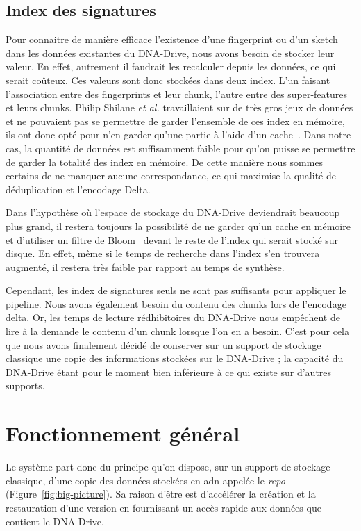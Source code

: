 \documentclass[a4paper]{report}
\makeatletter
\newcommand{\etal}{\emph{et al.}\@\xspace}
\makeatother
\begin{document}
\subsection{Index des signatures}
Pour connaitre de manière efficace l'existence d'une fingerprint
ou d'un sketch dans les données existantes du DNA-Drive, nous avons besoin de stocker leur valeur.
En effet, autrement il faudrait les recalculer depuis les données, ce qui serait coûteux.
Ces valeurs sont donc stockées dans deux index.
L'un faisant l'association entre des fingerprints et leur chunk,
l'autre entre des super-features et leurs chunks.
Philip Shilane \etal travaillaient sur de très gros jeux de données
et ne pouvaient pas se permettre de garder l'ensemble de ces index en mémoire,
ils ont donc opté pour n'en garder qu'une partie à l'aide d'un cache~\cite{shilane2012wan}.
Dans notre cas, la quantité de données est suffisamment faible pour qu'on puisse se permettre
de garder la totalité des index en mémoire.
De cette manière nous sommes certains de ne manquer aucune correspondance,
ce qui maximise la qualité de déduplication et l'encodage Delta.

Dans l'hypothèse où l'espace de stockage du DNA-Drive deviendrait beaucoup plus grand,
il restera toujours la possibilité de ne garder qu'un cache en mémoire
et d'utiliser un filtre de Bloom~\cite{bloom1970space} devant le reste de l'index qui serait stocké sur disque.
En effet, même si le temps de recherche dans l'index s'en trouvera augmenté,
il restera très faible par rapport au temps de synthèse.

Cependant, les index de signatures seuls ne sont pas suffisants pour appliquer le pipeline.
Nous avons également besoin du contenu des chunks lors de l'encodage delta.
Or, les temps de lecture rédhibitoires du DNA-Drive nous empêchent de lire à la demande le contenu d'un chunk lorsque l'on en a besoin.
C'est pour cela que nous avons finalement décidé de conserver sur un support de stockage classique une copie des informations stockées sur le DNA-Drive ;
la capacité du DNA-Drive étant pour le moment bien inférieure à ce qui existe sur d'autres supports.


\section{Fonctionnement général}

Le système part donc du principe qu'on dispose, sur un support de stockage classique, d'une copie des données stockées en \ac{adn} appelée le \emph{repo} (Figure~\ref{fig:big-picture}).
Sa raison d'être est d'accélérer la création et la restauration d'une version
en fournissant un accès rapide aux données que contient le DNA-Drive.
\end{document}
